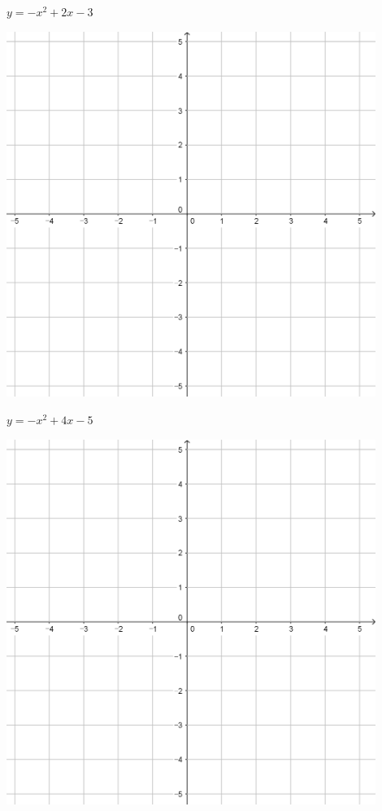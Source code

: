 \documentclass[a4paper]{oblivoir}
\begin{document}
\clearpage
\begin{minipage}{0.45\textwidth}\centering
\(y=-x^2+2x-3\)
\par\bigskip\includegraphics[width=0.9\textwidth]{55}
\end{minipage}
\begin{minipage}{0.45\textwidth}\centering
\(y=-x^2+4x-5\)
\par\bigskip\includegraphics[width=0.9\textwidth]{55}
\end{minipage}\bigskip\bigskip\par
\end{document}
